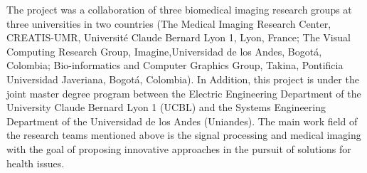 The project was a collaboration of three biomedical imaging research groups at three universities in two countries (The Medical Imaging Research Center, CREATIS-UMR, Universit\'{e} Claude Bernard Lyon 1, Lyon, France; The Visual Computing Research Group, Imagine,Universidad de los Andes, Bogot\'{a}, Colombia; Bio-informatics and Computer Graphics Group, Takina, Pontificia Universidad Javeriana, Bogot\'{a}, Colombia). In Addition, this project is under the joint master degree program between the Electric Engineering Department of the University Claude Bernard Lyon 1 (UCBL) and the Systems Engineering Department of the Universidad de los Andes (Uniandes). 
The main work field of the research teams mentioned above is the signal processing and medical imaging with the goal of proposing innovative approaches in the pursuit of solutions for health issues. 